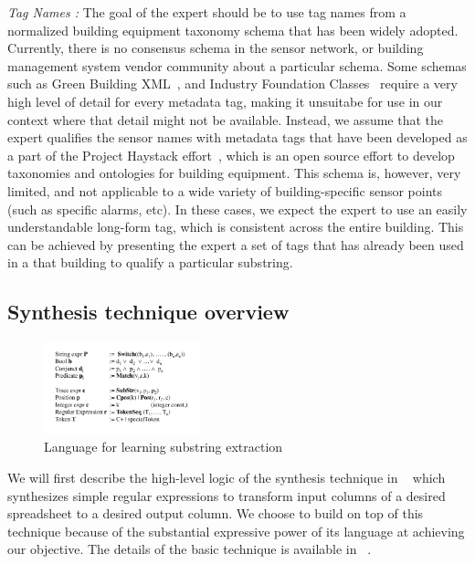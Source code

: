 {\it Tag Names :} The goal of the expert should be to use tag names from a normalized building equipment taxonomy schema that has been widely adopted. Currently, there is no consensus schema in the sensor network, or building management system vendor community about a particular schema. Some schemas such as Green Building XML~\cite{GBXML}, and Industry Foundation Classes~\cite{IFC} require a very high level of detail for every metadata tag, making it unsuitabe for use in our context where that detail might not be available. Instead, we assume that the expert qualifies the sensor names with metadata tags that have been developed as a part of the Project Haystack effort~\cite{haystack}, which is an open source effort to develop taxonomies and ontologies for building equipment. This schema is, however, very limited, and not applicable to a wide variety of building-specific sensor points (such as specific alarms, etc). In these cases, we expect the expert to use an easily understandable long-form tag, which is consistent across the entire building. This can be achieved by presenting the expert a set of tags that has already been used in a that building to qualify a particular substring. 


\subsection{Synthesis technique overview}
\label{sec:synth}

\begin{figure}[h!]
  
  \centering
    \includegraphics[width=0.4\textwidth]{figs/stringLanguage.pdf}
\caption{Language for learning substring extraction}
\label{fig:language}
\end{figure}


We will first describe the high-level logic of the synthesis technique in ~\cite{Gulwani:2011} which synthesizes simple regular expressions to transform input columns of a desired spreadsheet to a desired output column. We choose to build on top of this technique because of the substantial expressive power of its language at achieving our objective. The details of the basic technique is available in ~\cite{Gulwani:2011}. 

